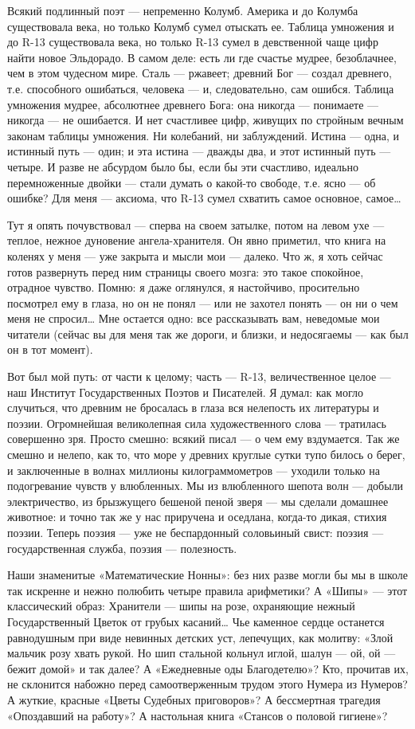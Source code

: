 \documentclass[11pt,openany]{book}
\begin{document}
Всякий подлинный поэт --- непременно Колумб. Америка и до Колумба существовала века, но только Колумб сумел отыскать ее. Таблица умножения и до R-13 существовала века, но только R-13 сумел в девственной чаще цифр найти новое Эльдорадо. В самом деле: есть ли где счастье мудрее, безоблачнее, чем в этом чудесном мире. Сталь --- ржавеет; древний Бог --- создал древнего, т.е. способного ошибаться, человека --- и, следовательно, сам ошибся. Таблица умножения мудрее, абсолютнее древнего Бога: она никогда --- понимаете --- никогда --- не ошибается. И нет счастливее цифр, живущих по стройным вечным законам таблицы умножения. Ни колебаний, ни заблуждений. Истина --- одна, и истинный путь --- один; и эта истина --- дважды два, и этот истинный путь --- четыре. И разве не абсурдом было бы, если бы эти счастливо, идеально перемноженные двойки --- стали думать о какой-то свободе, т.е. ясно --- об ошибке? Для меня --- аксиома, что R-13 сумел схватить самое основное, самое\ldots{}

Тут я опять почувствовал --- сперва на своем затылке, потом на левом ухе --- теплое, нежное дуновение ангела-хранителя. Он явно приметил, что книга на коленях у меня --- уже закрыта и мысли мои --- далеко. Что ж, я хоть сейчас готов развернуть перед ним страницы своего мозга: это такое спокойное, отрадное чувство. Помню: я даже оглянулся, я настойчиво, просительно посмотрел ему в глаза, но он не понял --- или не захотел понять --- он ни о чем меня не спросил\ldots{} Мне остается одно: все рассказывать вам, неведомые мои читатели (сейчас вы для меня так же дороги, и близки, и недосягаемы --- как был он в тот момент).

Вот был мой путь: от части к целому; часть --- R-13, величественное целое --- наш Институт Государственных Поэтов и Писателей. Я думал: как могло случиться, что древним не бросалась в глаза вся нелепость их литературы и поэзии. Огромнейшая великолепная сила художественного слова --- тратилась совершенно зря. Просто смешно: всякий писал --- о чем ему вздумается. Так же смешно и нелепо, как то, что море у древних круглые сутки тупо билось о берег, и заключенные в волнах миллионы килограммометров --- уходили только на подогревание чувств у влюбленных. Мы из влюбленного шепота волн --- добыли электричество, из брызжущего бешеной пеной зверя --- мы сделали домашнее животное: и точно так же у нас приручена и оседлана, когда-то дикая, стихия поэзии. Теперь поэзия --- уже не беспардонный соловьиный свист: поэзия --- государственная служба, поэзия --- полезность.

Наши знаменитые «Математические Нонны»: без них разве могли бы мы в школе так искренне и нежно полюбить четыре правила арифметики? А «Шипы» --- этот классический образ: Хранители --- шипы на розе, охраняющие нежный Государственный Цветок от грубых касаний\ldots{} Чье каменное сердце останется равнодушным при виде невинных детских уст, лепечущих, как молитву: «Злой мальчик розу хвать рукой. Но шип стальной кольнул иглой, шалун --- ой, ой --- бежит домой» и так далее? А «Ежедневные оды Благодетелю»? Кто, прочитав их, не склонится набожно перед самоотверженным трудом этого Нумера из Нумеров? А жуткие, красные «Цветы Судебных приговоров»? А бессмертная трагедия «Опоздавший на работу»? А настольная книга «Стансов о половой гигиене»?
\end{document}
